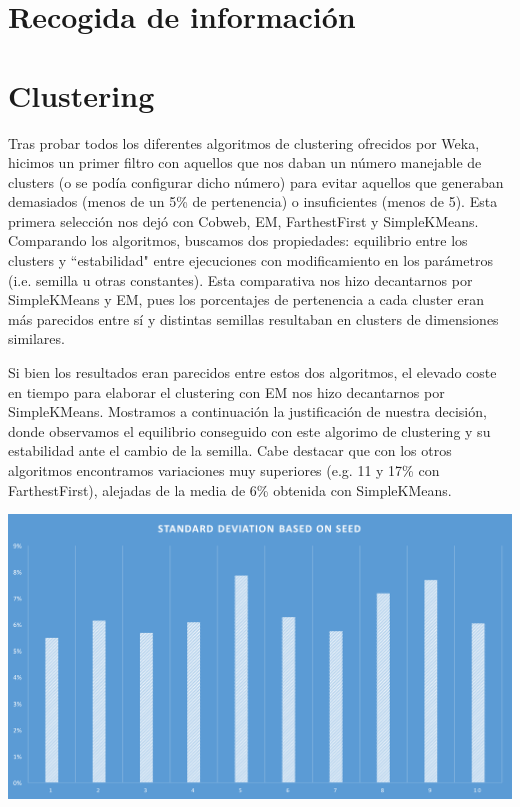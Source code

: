 \documentclass[12pt]{article}
\begin{document}
\newpage
\section{Recogida de información}



\section{Clustering}


Tras probar todos los diferentes algoritmos de clustering ofrecidos por Weka, hicimos un primer filtro con aquellos que nos daban un número manejable de clusters (o se podía configurar dicho número) para evitar aquellos que generaban demasiados (menos de un 5\% de pertenencia) o insuficientes (menos de 5). Esta primera selección nos dejó con Cobweb, EM, FarthestFirst y SimpleKMeans. Comparando los algoritmos, buscamos dos propiedades: equilibrio entre los clusters y ``estabilidad" entre ejecuciones con modificamiento en los parámetros (i.e. semilla u otras constantes). Esta comparativa nos hizo decantarnos por SimpleKMeans y EM, pues los porcentajes de pertenencia a cada cluster eran más parecidos entre sí y distintas semillas resultaban en clusters de dimensiones similares.

Si bien los resultados eran parecidos entre estos dos algoritmos, el elevado coste en tiempo para elaborar el clustering con EM nos hizo decantarnos por SimpleKMeans. Mostramos a continuación la justificación de nuestra decisión, donde observamos el equilibrio conseguido con este algorimo de clustering y su estabilidad ante el cambio de la semilla. Cabe destacar que con los otros algoritmos encontramos variaciones muy superiores (e.g. 11 y 17\% con FarthestFirst), alejadas de la media de 6\% obtenida con SimpleKMeans.

\begin{center}
    \includegraphics[width=15cm]{stdff}
\end{center}
\end{document}
